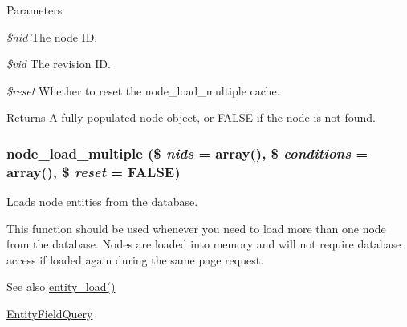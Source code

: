 \begin{DoxyParams}{Parameters}
\item[{\em \$nid}]The node ID. \item[{\em \$vid}]The revision ID. \item[{\em \$reset}]Whether to reset the node\_\-load\_\-multiple cache.\end{DoxyParams}
\begin{DoxyReturn}{Returns}
A fully-\/populated node object, or FALSE if the node is not found. 
\end{DoxyReturn}
\hypertarget{node_8module_a12f29f65250380f9e592d8d5497313e3}{
\subsubsection[{node\_\-load\_\-multiple}]{\setlength{\rightskip}{0pt plus 5cm}node\_\-load\_\-multiple (\$ {\em nids} = {\ttfamily array()}, \/  \$ {\em conditions} = {\ttfamily array()}, \/  \$ {\em reset} = {\ttfamily FALSE})}}
\label{node_8module_a12f29f65250380f9e592d8d5497313e3}
Loads node entities from the database.

This function should be used whenever you need to load more than one node from the database. Nodes are loaded into memory and will not require database access if loaded again during the same page request.

\begin{DoxySeeAlso}{See also}
\hyperlink{common_8inc_a78b89cf93f9710a68d02f86adccf1898}{entity\_\-load()} 

\hyperlink{classEntityFieldQuery}{EntityFieldQuery}
\end{DoxySeeAlso}

